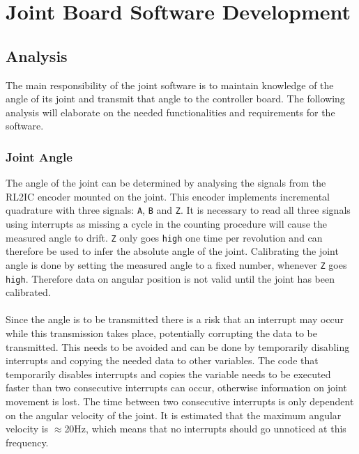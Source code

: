 \section{Joint Board Software Development} %
\label{sub:joint_board_software}

\subsection{Analysis} %
\label{ssub:joint_board_analysis}
The main responsibility of the joint software is to maintain knowledge of the angle of its joint and transmit that angle to the controller board.
The following analysis will elaborate on the needed functionalities and requirements for the software.

\subsubsection{Joint Angle}
The angle of the joint can be determined by analysing the signals from the RL2IC encoder mounted on the joint.
This encoder implements incremental quadrature with three signals: \texttt{A}, \texttt{B} and \texttt{Z}.
It is necessary to read all three signals using interrupts as missing a cycle in the counting procedure will cause the measured angle to drift.
\texttt{Z} only goes \texttt{high} one time per revolution and can therefore be used to infer the absolute angle of the joint.
Calibrating the joint angle is done by setting the measured angle to a fixed number, whenever \texttt{Z} goes \texttt{high}.
Therefore data on angular position is not valid until the joint has been calibrated.
\\~\\
Since the angle is to be transmitted there is a risk that an interrupt may occur while this transmission takes place, potentially corrupting the data to be transmitted.
This needs to be avoided and can be done by temporarily disabling interrupts and copying the needed data to other variables.
The code that temporarily disables interrupts and copies the variable needs to be executed faster than two consecutive interrupts can occur, otherwise information on joint movement is lost.
The time between two consecutive interrupts is only dependent on the angular velocity of the joint.
It is estimated that the maximum angular velocity is  $\approx$20Hz, which means that no interrupts should go unnoticed at this frequency.

